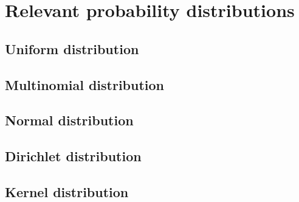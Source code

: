 \chapter{Relevant probability distributions}

\section*{Uniform distribution}

\section*{Multinomial distribution}

\section*{Normal distribution}

\section*{Dirichlet distribution}

\section*{Kernel distribution}

